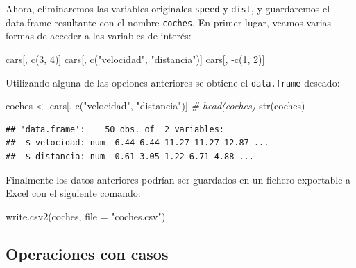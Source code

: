 \documentclass[
]{book}
\newenvironment{Shaded}{\begin{snugshade}}{\end{snugshade}}
\newcommand{\AttributeTok}[1]{\textcolor[rgb]{0.77,0.63,0.00}{#1}}
\newcommand{\CommentTok}[1]{\textcolor[rgb]{0.56,0.35,0.01}{\textit{#1}}}
\newcommand{\DecValTok}[1]{\textcolor[rgb]{0.00,0.00,0.81}{#1}}
\newcommand{\FunctionTok}[1]{\textcolor[rgb]{0.00,0.00,0.00}{#1}}
\newcommand{\NormalTok}[1]{#1}
\newcommand{\OtherTok}[1]{\textcolor[rgb]{0.56,0.35,0.01}{#1}}
\newcommand{\SpecialCharTok}[1]{\textcolor[rgb]{0.00,0.00,0.00}{#1}}
\newcommand{\StringTok}[1]{\textcolor[rgb]{0.31,0.60,0.02}{#1}}
\theoremstyle{break}
\begin{document}
Ahora, eliminaremos las variables originales \texttt{speed} y
\texttt{dist}, y guardaremos el data.frame resultante con el nombre \texttt{coches}.
En primer lugar, veamos varias formas de acceder a las variables de
interés:

\begin{Shaded}
\begin{Highlighting}[]
\NormalTok{cars[, }\FunctionTok{c}\NormalTok{(}\DecValTok{3}\NormalTok{, }\DecValTok{4}\NormalTok{)]}
\NormalTok{cars[, }\FunctionTok{c}\NormalTok{(}\StringTok{"velocidad"}\NormalTok{, }\StringTok{"distancia"}\NormalTok{)]}
\NormalTok{cars[, }\SpecialCharTok{{-}}\FunctionTok{c}\NormalTok{(}\DecValTok{1}\NormalTok{, }\DecValTok{2}\NormalTok{)]}
\end{Highlighting}
\end{Shaded}

Utilizando alguna de las opciones anteriores se obtiene el \texttt{data.frame}
deseado:

\begin{Shaded}
\begin{Highlighting}[]
\NormalTok{coches }\OtherTok{\textless{}{-}}\NormalTok{ cars[, }\FunctionTok{c}\NormalTok{(}\StringTok{"velocidad"}\NormalTok{, }\StringTok{"distancia"}\NormalTok{)]}
\CommentTok{\# head(coches)}
\FunctionTok{str}\NormalTok{(coches)}
\end{Highlighting}
\end{Shaded}

\begin{verbatim}
## 'data.frame':    50 obs. of  2 variables:
##  $ velocidad: num  6.44 6.44 11.27 11.27 12.87 ...
##  $ distancia: num  0.61 3.05 1.22 6.71 4.88 ...
\end{verbatim}

Finalmente los datos anteriores podrían ser guardados en un fichero
exportable a Excel con el siguiente comando:

\begin{Shaded}
\begin{Highlighting}[]
\FunctionTok{write.csv2}\NormalTok{(coches, }\AttributeTok{file =} \StringTok{"coches.csv"}\NormalTok{)}
\end{Highlighting}
\end{Shaded}

\hypertarget{operaciones-con-casos}{%
\subsection{Operaciones con casos}\label{operaciones-con-casos}}
\end{document}
